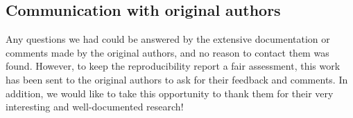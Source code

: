 





\subsection{Communication with original authors}

Any questions we had could be answered by the extensive documentation or comments made by the original authors, and no reason to contact them was found. However, to keep the reproducibility report a fair assessment, this work has been sent to the original authors to ask for their feedback and comments. In addition, we would like to take this opportunity to thank them for their very interesting and well-documented research!


